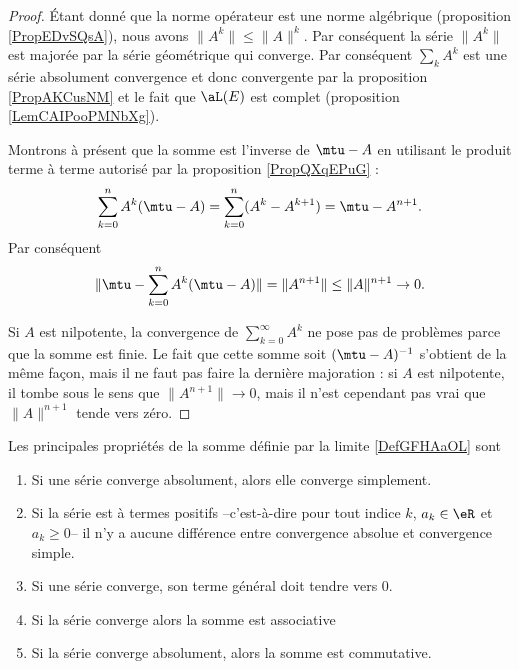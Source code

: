 \begin{proof}
    Étant donné que la norme opérateur est une norme algébrique (proposition \ref{PropEDvSQsA}), nous avons \( \| A^k \|\leq \| A \|^k\). Par conséquent la série \( \| A^k \|\) est majorée par la série géométrique qui converge. Par conséquent \( \sum_{k}A^k\) est une série absolument convergence et donc convergente par la proposition \ref{PropAKCusNM} et le fait que \( \aL(E)\) est complet (proposition \ref{LemCAIPooPMNbXg}).
    
    Montrons à présent que la somme est l'inverse de \( \mtu-A\) en utilisant le produit terme à terme autorisé par la proposition \ref{PropQXqEPuG} :
    \begin{equation}
        \sum_{k=0}^nA^k(\mtu-A)=\sum_{k=0}^n(A^k-A^{k+1})=\mtu-A^{n+1}.
    \end{equation}
    Par conséquent 
    \begin{equation}
        \| \mtu-\sum_{k=0}^nA^k(\mtu-A) \|=\| A^{n+1} \|\leq \| A \|^{n+1}\to 0.
    \end{equation}

    Si \( A\) est nilpotente, la convergence de \( \sum_{k=0}^{\infty}A^k\) ne pose pas de problèmes parce que la somme est finie. Le fait que cette somme soit \( (\mtu-A)^{-1}\) s'obtient de la même façon, mais il ne faut pas faire la dernière majoration : si \( A\) est nilpotente, il tombe sous le sens que \( \| A^{n+1} \|\to 0\), mais il n'est cependant pas vrai que \( \| A \|^{n+1}\) tende vers zéro.
\end{proof}

\begin{proposition}\label{propnseries_propdebase}
Les principales propriétés de la somme définie par la limite \eqref{DefGFHAaOL} sont
  \begin{enumerate}
  \item Si une série converge absolument, alors elle converge simplement.
  \item Si la série est à termes positifs --c'est-à-dire pour tout indice $k$, $a_k \in \eR$ et $a_k \geq 0$-- il n'y a aucune différence entre convergence absolue et convergence simple.
  \item\label{point3-seriepropdebase} Si une série converge, son terme général doit tendre vers $0$.
\item 
Si la série converge alors la somme est associative
\item
Si la série converge absolument, alors la somme est commutative.
  \end{enumerate}
\end{proposition}

